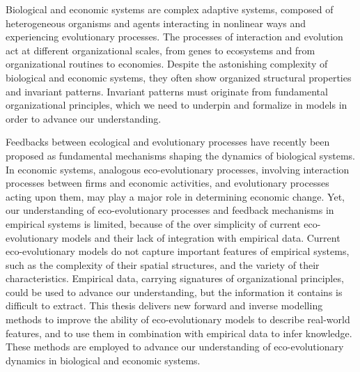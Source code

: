 %
\label{sec:summary}

Biological and economic systems are complex adaptive systems, composed of heterogeneous organisms and agents interacting in nonlinear ways and experiencing evolutionary processes.
% 
The processes of interaction and evolution act at different organizational scales, from genes to ecosystems and from organizational routines to economies. Despite the astonishing complexity of biological and economic systems, they often show organized structural properties and invariant patterns. 
% 
%
Invariant patterns must originate from fundamental organizational principles, which we need to underpin and formalize in models in order to advance our understanding.

Feedbacks between ecological and evolutionary processes have recently been proposed as fundamental mechanisms shaping the dynamics of biological systems. %
% 
In economic systems, analogous eco-evolutionary processes, involving interaction processes between firms and economic activities, and evolutionary processes acting upon them, may play a major role in determining economic change. 
Yet, our understanding of eco-evolutionary processes and feedback mechanisms in empirical systems is limited, because of the over simplicity of current eco-evolutionary models and their lack of integration with empirical data. Current eco-evolutionary models do not capture important features of empirical systems, such as the complexity of their spatial structures, and the variety of their characteristics. Empirical data, carrying signatures of organizational principles, could be used to advance our understanding, but the information it contains is difficult to extract.
% 
This thesis delivers new forward and inverse modelling methods to improve the ability of eco-evolutionary models to describe real-world features, and to use them in combination with empirical data to infer knowledge. These methods are employed to advance our understanding of eco-evolutionary dynamics in biological and economic systems.

